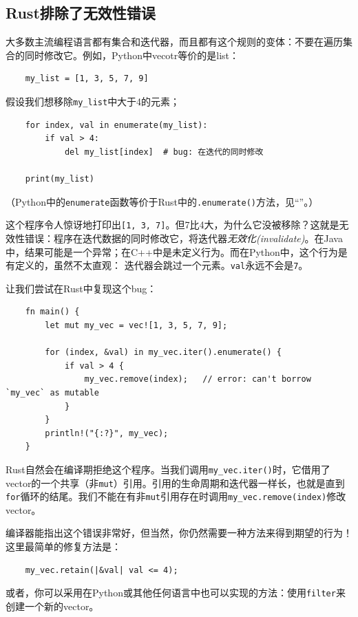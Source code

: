 \subsection{Rust排除了无效性错误}
大多数主流编程语言都有集合和迭代器，而且都有这个规则的变体：不要在遍历集合的同时修改它。例如，Python中vecotr等价的是list：
\begin{verbatim}
    my_list = [1, 3, 5, 7, 9]
\end{verbatim}

假设我们想移除\texttt{my\_list}中大于4的元素；
\begin{verbatim}
    for index, val in enumerate(my_list):
        if val > 4:
            del my_list[index]  # bug: 在迭代的同时修改
    
    print(my_list)
\end{verbatim}
（Python中的\texttt{enumerate}函数等价于Rust中的\texttt{.enumerate()}方法，见“”。）

这个程序令人惊讶地打印出\texttt{[1, 3, 7]}。但7比4大，为什么它没被移除？这就是无效性错误：程序在迭代数据的同时修改它，将迭代器\emph{无效化(invalidate)}。在Java中，结果可能是一个异常；在C++中是未定义行为。而在Python中，这个行为是有定义的，虽然不太直观：
迭代器会跳过一个元素。\texttt{val}永远不会是\texttt{7}。

让我们尝试在Rust中复现这个bug：
\begin{verbatim}
    fn main() {
        let mut my_vec = vec![1, 3, 5, 7, 9];
        
        for (index, &val) in my_vec.iter().enumerate() {
            if val > 4 {
                my_vec.remove(index);   // error: can't borrow `my_vec` as mutable
            }
        }
        println!("{:?}", my_vec);
    }
\end{verbatim}

Rust自然会在编译期拒绝这个程序。当我们调用\texttt{my\_vec.iter()}时，它借用了vector的一个共享（非\texttt{mut}）引用。引用的生命周期和迭代器一样长，也就是直到\texttt{for}循环的结尾。我们不能在有非\texttt{mut}引用存在时调用\texttt{my\_vec.remove(index)}修改vector。

编译器能指出这个错误非常好，但当然，你仍然需要一种方法来得到期望的行为！这里最简单的修复方法是：
\begin{verbatim}
    my_vec.retain(|&val| val <= 4);
\end{verbatim}

或者，你可以采用在Python或其他任何语言中也可以实现的方法：使用\texttt{filter}来创建一个新的vector。

